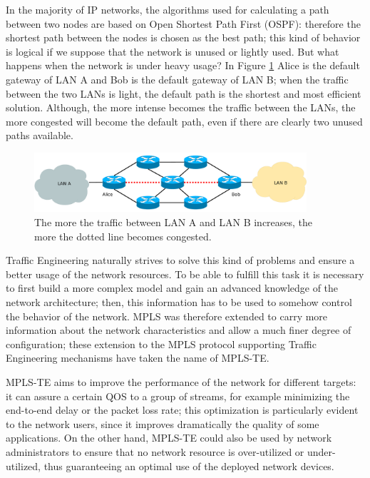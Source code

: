 \documentclass[10pt,a4paper]{report}
\begin{document}
In the majority of IP networks, the algorithms used for calculating a
path between two nodes are based on Open Shortest Path First (OSPF):
therefore the shortest path between the nodes is chosen as the best
path; this kind of behavior is logical if we suppose that the network
is unused or lightly used. But what happens when the network is under
heavy usage? In Figure \ref{fig:mpls_te} Alice is the default gateway
of LAN A and Bob is the default gateway of LAN B; when the traffic
between the two LANs is light, the default path is the shortest and
most efficient solution. Although, the more intense becomes the traffic
between the LANs, the more congested will become the default path,
even if there are clearly two unused paths available.

\begin{figure}[!hbp]
  \centering
  \includegraphics[width=0.9\textwidth]{img/mpls_te}
  \caption[Traffic Engineering]{The more the traffic between LAN A and LAN
    B increases, the more the dotted line becomes congested.}
  \label{fig:mpls_te}
\end{figure}

Traffic Engineering naturally strives to solve this kind of problems
and ensure a better usage of the network resources. To be able to
fulfill this task it is necessary to first build a more complex model
and gain an advanced knowledge of the network architecture; then, this
information has to be used to somehow control the behavior of the
network. MPLS was therefore extended to carry more information about
the network characteristics and allow a much finer degree of
configuration; these extension to the MPLS protocol supporting Traffic
Engineering mechanisms have taken the name of MPLS-TE.

MPLS-TE aims to improve the performance of the network for different
targets: it can assure a certain QOS to a group of streams, for
example minimizing the end-to-end delay or the packet loss rate; this
optimization is particularly evident to the network users, since it
improves dramatically the quality of some applications. On the other
hand, MPLS-TE could also be used by network administrators to ensure
that no network resource is over-utilized or under-utilized, thus
guaranteeing an optimal use of the deployed network devices.
\end{document}
